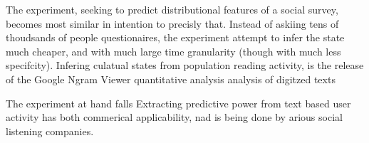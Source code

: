 The experiment, seeking to predict distributional features of a social survey, becomes most similar in intention to precisly that.
Instead of askiing tens of thoudsands of people questionaires,
the experiment attempt to infer the state much cheaper, and with much large time granularity (though with much less specifcity).
Infering culatual states from population reading activity,
is
 the release of the Google Ngram Viewer quantitative analysis analysis of digitzed texts


The experiment at hand falls 
Extracting predictive power from text based user activity has both commerical applicability, nad is being done by arious social listening companies.

